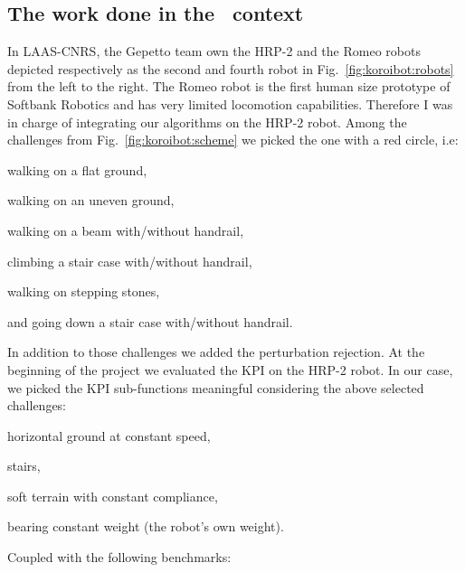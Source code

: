 \subsection*{The work done in the \koroibot\ context}

In LAAS-CNRS, the Gepetto team own the HRP-2 and the Romeo robots depicted respectively as the second and fourth robot in Fig.~\ref{fig:koroibot:robots} from the left to the right.
The Romeo robot is the first human size prototype of Softbank Robotics and has very limited locomotion capabilities.
Therefore I was in charge of integrating our algorithms on the HRP-2 robot.
Among the challenges from Fig.~\ref{fig:koroibot:scheme} we picked the one with a red circle, i.e:
\begin{list}{ .}{%
		\setlength{\topsep}{5pt}%
		\setlength{\itemsep}{0pt}%
		\setlength{\parsep}{0pt}%
		\setlength{\labelwidth}{3.em}%
		\setlength{\leftmargin}{2em}%
		\setlength{\labelsep}{0.5em}%
	}
\item[\bluesquare] walking on a flat ground,
\item[\bluesquare] walking on an uneven ground,
\item[\bluesquare] walking on a beam with/without handrail,
\item[\bluesquare] climbing a stair case with/without handrail,
\item[\bluesquare] walking on stepping stones,
\item[\bluesquare] and going down a stair case with/without handrail.
\end{list}
In addition to those challenges we added the perturbation rejection.
At the beginning of the project we evaluated the KPI on the HRP-2 robot.
In our case, we picked the KPI sub-functions meaningful considering the above selected challenges:
\begin{list}{ .}{%
		\setlength{\topsep}{5pt}%
		\setlength{\itemsep}{0pt}%
		\setlength{\parsep}{0pt}%
		\setlength{\labelwidth}{3.em}%
		\setlength{\leftmargin}{2em}%
		\setlength{\labelsep}{0.5em}%
	}
\item[\bluesquare] horizontal ground at constant speed,
\item[\bluesquare] stairs,
\item[\bluesquare] soft terrain with constant compliance,
\item[\bluesquare] bearing constant weight (the robot's own weight).
\end{list}
Coupled with the following benchmarks:
